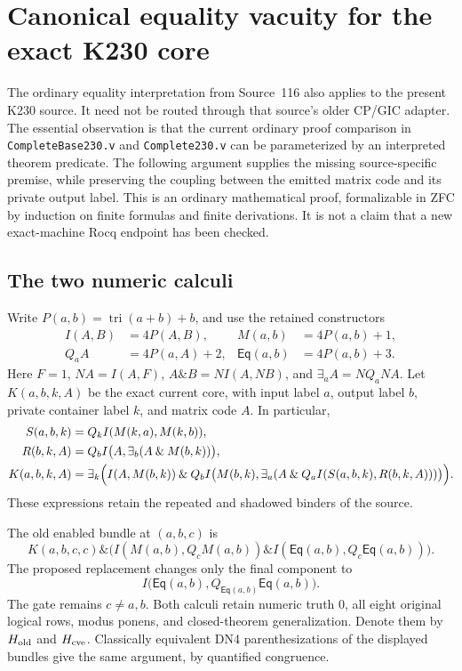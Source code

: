 \section{Canonical equality vacuity for the exact K230 core}
\label{sec:canonical-ve-transport}

The ordinary equality interpretation from Source~116 also applies to the
present K230 source.  It need not be routed through that source's older
CP/GIC adapter.  The essential observation is that the current ordinary
proof comparison in \texttt{CompleteBase230.v} and \texttt{Complete230.v}
can be parameterized by an interpreted theorem predicate.  The following
argument supplies the missing source-specific premise, while preserving
the coupling between the emitted matrix code and its private output label.
This is an ordinary mathematical proof, formalizable in ZFC by induction
on finite formulas and finite derivations.  It is not a claim that a new
exact-machine Rocq endpoint has been checked.

\subsection{The two numeric calculi}

Write $P(a,b)=\operatorname{tri}(a+b)+b$, and use the retained constructors
\begin{align*}
 I(A,B)&=4P(A,B), & M(a,b)&=4P(a,b)+1,\\
 Q_a A&=4P(a,A)+2, & \mathsf{Eq}(a,b)&=4P(a,b)+3.
\end{align*}
Here $F=1$, $N A=I(A,F)$, $A\mathbin{\&}B=N I(A,N B)$, and
$\exists_a A=N Q_a N A$.  Let $K(a,b,k,A)$ be the exact current core,
with input label $a$, output label $b$, private container label $k$,
and matrix code $A$.  In particular,
\begin{align*}
 S(a,b,k)&=Q_k I(M(k,a),M(k,b)),\\
 R(b,k,A)&=Q_b I\bigl(A,\exists_b(A\mathbin{\&}M(b,k))\bigr),\\
 K(a,b,k,A)&=\exists_k\Bigl(
 I(A,M(b,k))\mathbin{\&}
 Q_b I\bigl(M(b,k),\exists_a(A\mathbin{\&}
 Q_a I(S(a,b,k),R(b,k,A)))\bigr)\Bigr).
\end{align*}
These expressions retain the repeated and shadowed binders of the source.

The old enabled bundle at $(a,b,c)$ is
\[
 K(a,b,c,c)\mathbin{\&}
 \bigl(I(M(a,b),Q_cM(a,b))\mathbin{\&}
 I(\mathsf{Eq}(a,b),Q_c\mathsf{Eq}(a,b))\bigr).
\]
The proposed replacement changes only the final component to
\[
 I\bigl(\mathsf{Eq}(a,b),Q_{\mathsf{Eq}(a,b)}\mathsf{Eq}(a,b)\bigr).
 \tag{CVE}
\]
The gate remains $c\ne a,b$.  Both calculi retain numeric truth $0$,
all eight original logical rows, modus ponens, and closed-theorem
generalization.  Denote them by $H_{\rm old}$ and $H_{\rm cve}$.
Classically equivalent DN4 parenthesizations of the displayed bundles
give the same argument, by quantified congruence.

